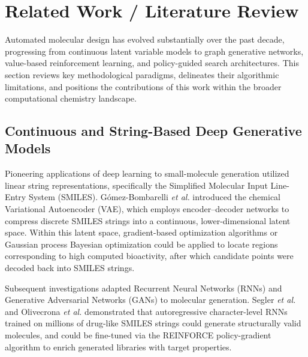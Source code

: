 \documentclass{ieeeaccess}
\begin{document}
\section{Related Work / Literature Review}
\label{sec:related}
Automated molecular design has evolved substantially over the past decade, progressing from continuous latent variable models to graph generative networks, value-based reinforcement learning, and policy-guided search architectures. This section reviews key methodological paradigms, delineates their algorithmic limitations, and positions the contributions of this work within the broader computational chemistry landscape.

\subsection{Continuous and String-Based Deep Generative Models}
Pioneering applications of deep learning to small-molecule generation utilized linear string representations, specifically the Simplified Molecular Input Line-Entry System (SMILES). Gómez-Bombarelli \emph{et al.} \cite{gomez2018} introduced the chemical Variational Autoencoder (VAE), which employs encoder--decoder networks to compress discrete SMILES strings into a continuous, lower-dimensional latent space. Within this latent space, gradient-based optimization algorithms or Gaussian process Bayesian optimization could be applied to locate regions corresponding to high computed bioactivity, after which candidate points were decoded back into SMILES strings.

Subsequent investigations adapted Recurrent Neural Networks (RNNs) and Generative Adversarial Networks (GANs) to molecular generation. Segler \emph{et al.} \cite{segler2018} and Olivecrona \emph{et al.} \cite{olivecrona2017} demonstrated that autoregressive character-level RNNs trained on millions of drug-like SMILES strings could generate structurally valid molecules, and could be fine-tuned via the REINFORCE policy-gradient algorithm to enrich generated libraries with target properties.
\end{document}
